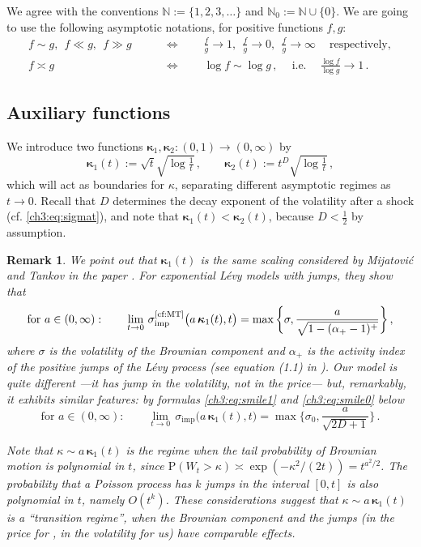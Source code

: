 \documentclass[a4paper,reqno,11pt]{amsart}
\numberwithin{equation}{section}
\newtheorem{remark}[theorem]{Remark}
\newcommand{\N}{\mathbb{N}}
\newcommand{\PEfont}{\mathrm}
\renewcommand{\P}{\ensuremath{\PEfont P}}
\newcommand\imp{\mathrm{imp}}
\newcommand\bkappa{\boldsymbol{\kappa}}
\begin{document}
We agree with the conventions $\N := \{1,2,3,\ldots\}$ and $\N_0 := \N \cup \{0\}$.
We are going to use the following asymptotic notations, for positive functions $f,g$:
\begin{align}\label{ch3:eq:notation}
	f \sim g, \ \  f \ll g, \ \ f \gg g \qquad &\iff \qquad
	\frac{f}{g} \to 1, \ \ \frac{f}{g} \to 0, \ \ \frac{f}{g} \to \infty 
	\quad \ \text{respectively}, \\
	\label{ch3:eq:notation2}
	f \asymp g \qquad &\iff \qquad \log f \sim \log g \,, 
	\quad \ \text{i.e.} \quad \
	\frac{\log f}{\log g} \to 1 \,.
\end{align}


\subsection{Auxiliary functions}
We introduce two functions $\bkappa_1, \bkappa_2 : (0,1) \to (0,\infty)$ by
\begin{equation} \label{ch3:eq:gh}
	\bkappa_1(t) := \sqrt{t} \sqrt{\log \tfrac{1}{t}} \,, \qquad
	\bkappa_2(t) := t^D \sqrt{\log \tfrac{1}{t}} \,,
\end{equation}
which will act as boundaries for $\kappa$, separating
different asymptotic regimes as $t \to 0$.
Recall that $D$ determines the decay exponent of the volatility after a shock 
(cf. \eqref{ch3:eq:sigmat}), and
note that $\bkappa_1(t) < \bkappa_2(t)$, because $D < \frac{1}{2}$ by assumption.
 
\begin{remark}\rm
We point out that $\bkappa_1(t)$ is the same scaling considered 
by Mijatovi\'{c} and Tankov in the paper \cite{cf:MT}.
For exponential L\'evy models with
jumps, they show that
\begin{equation*}
	\text{for } a \in (0,\infty): \qquad
	\lim_{t\to 0} \, \sigma_\imp^{\text{\cite{cf:MT}}}\big( a\, \bkappa_1(t), t \big) =
	\max\bigg\{\sigma, \frac{a}{\sqrt{1-(\alpha_+-1)^+}} \bigg\} \,,
\end{equation*}
where $\sigma$ is the volatility of the Brownian component and $\alpha_+$
is the activity index of the positive jumps of the L\'evy process 
(see equation (1.1) in \cite{cf:MT}).
Our model is quite different ---it has jump in the volatility, not in the price---
but, remarkably, it exhibits similar features: by formulas \eqref{ch3:eq:smile1} 
and \eqref{ch3:eq:smile0} below
\begin{equation*}
	\text{for } a \in (0,\infty): \qquad
	\lim_{t\to 0} \, \sigma_\imp\big( a\, \bkappa_1(t), t \big) =
	\max\bigg\{\sigma_0, \frac{a}{\sqrt{2D+1}} \bigg\} \,.
\end{equation*}

Note that $\kappa \sim a \, \bkappa_1(t)$ is the regime when the tail probability
of Brownian motion is polynomial in $t$, since
$\P(W_t > \kappa) \asymp \exp(-\kappa^2/(2t)) = t^{a^2/2}$.
The probability that a Poisson process has $k$ jumps in the interval
$[0,t]$ is also polynomial in $t$, namely $O(t^k)$. These
considerations suggest that $\kappa \sim a \, \bkappa_1(t)$ is a
``transition regime'',
when the Brownian component and the jumps 
(in the price for \cite{cf:MT}, in the volatility for us)
have comparable effects.
\end{remark}
\end{document}
